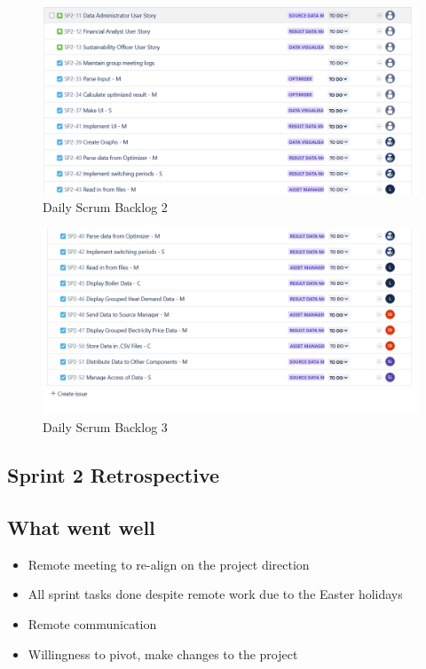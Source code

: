 \documentclass[12pt]{report}
\begin{document}
\begin{figure}[H]
  \centering
  \includegraphics[width=1\textwidth]{Resources/2-Sprint/Daily-Scrum/backlog2.png}
  \caption{Daily Scrum Backlog 2}
  \label{fig:S2Scrum2-image}
\end{figure}

\begin{figure}[H]
  \centering
  \includegraphics[width=1\textwidth]{Resources/2-Sprint/Daily-Scrum/backlog3.png}
  \caption{Daily Scrum Backlog 3}
  \label{fig:S2Scrum3-image}
\end{figure}


\subsection*{Sprint 2 Retrospective}

\subsection*{What went well}
\begin{itemize}
    \item Remote meeting to re-align on the project direction
    \item All sprint tasks done despite remote work due to the Easter holidays
    \item Remote communication
    \item Willingness to pivot, make changes to the project
\end{itemize}
\end{document}

